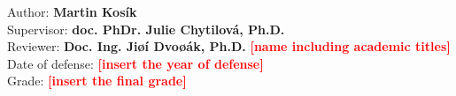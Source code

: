 \pagestyle{empty}

\vfill

\vglue 16cm

\noindent \large{Author: \textbf{Martin Kosík }}\\
\noindent \large{Supervisor: \textbf{doc. PhDr. Julie Chytilová, Ph.D.}}\\
\noindent \large{Reviewer: \textbf{Doc. Ing. Jiøí Dvoøák, Ph.D. }}\normalsize{\textbf{\textcolor{red}{[name including academic titles]}}}\\
\noindent \large{Date of defense:}
\normalsize{\textbf{\textcolor{red}{[insert the year of defense]}}}\\
\newline
\noindent \large{Grade:} \normalsize{\textbf{\textcolor{red}{[insert the final grade]}}}\\

